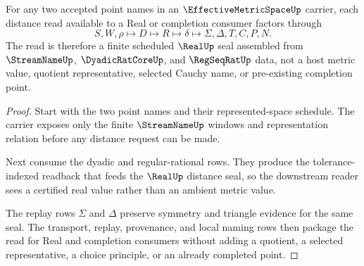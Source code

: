 \begin{theorem}
\label{thm:effective-metric-space-distance-readback}
For any two accepted point names in an $\EffectiveMetricSpaceUp$ carrier, each distance read available to a Real or completion consumer factors through
$$
S,W,\rho \longmapsto D \longmapsto R \longmapsto \delta \longmapsto \Sigma,\Delta,T,C,P,N.
$$
The read is therefore a finite scheduled $\RealUp$ seal assembled from $\StreamNameUp$, $\DyadicRatCoreUp$, and $\RegSeqRatUp$ data, not a host metric value, quotient representative, selected Cauchy name, or pre-existing completion point.
\end{theorem}
\begin{proof}
Start with the two point names and their represented-space schedule. The carrier exposes only the finite $\StreamNameUp$ windows and representation relation before any distance request can be made.

Next consume the dyadic and regular-rational rows. They produce the tolerance-indexed readback that feeds the $\RealUp$ distance seal, so the downstream reader sees a certified real value rather than an ambient metric value.

The replay rows $\Sigma$ and $\Delta$ preserve symmetry and triangle evidence for the same seal. The transport, replay, provenance, and local naming rows then package the read for Real and completion consumers without adding a quotient, a selected representative, a choice principle, or an already completed point.
\end{proof}


\begin{closurestatus}{\EffectiveMetricSpaceUp}
  \theoryclosure{\seedClosure}
  \formalstatus{\unformalizedV}
\end{closurestatus}
